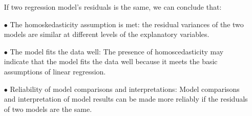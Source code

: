 \documentclass[12pt,letterpaper]{article}
\begin{document}
\begin{enumerate}
				If two regression model's residuals is the same, we can conclude that:
		
		\item[$\bullet$] The homoskedasticity assumption is met: the residual variances of the two models are similar at different levels of the explanatory variables.
		\item[$\bullet$]The model fits the data well: The presence of homoscedasticity may indicate that the model fits the data well because it meets the basic assumptions of linear regression.
		\item[$\bullet$]Reliability of model comparisons and interpretations: Model comparisons and interpretation of model results can be made more reliably if the residuals of two models are the same.
		
	\end{enumerate}
\end{document}
